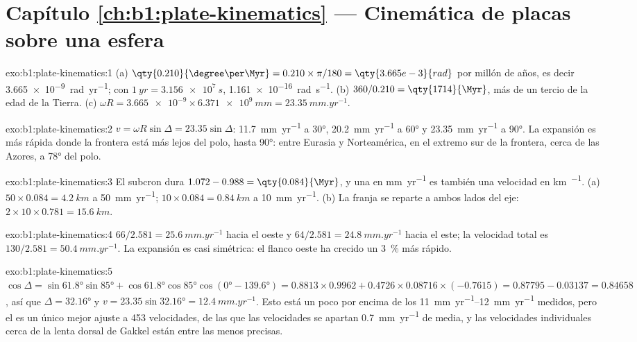 \section*{Capítulo \ref{ch:b1:plate-kinematics} --- Cinemática de placas sobre una esfera}

\begin{solution}{exo:b1:plate-kinematics:1}
(a) $\qty{0.210}{\degree\per\Myr} = 0.210\times\pi/180 = \qty{3.665e-3}{rad}$
por millón de años, es decir \qty{3.665e-9}{rad.yr^{-1}}; con
$\qty{1}{yr} = \qty{3.156e7}{s}$, \qty{1.161e-16}{rad.s^{-1}}. (b) $360/0.210 =
\qty{1714}{\Myr}$, más de un tercio de la edad de la Tierra. (c) $\omega R =
\num{3.665e-9}\times\qty{6.371e9}{mm} = \qty{23.35}{mm.yr^{-1}}$.
\end{solution}

\begin{solution}{exo:b1:plate-kinematics:2}
$v = \omega R\sin\Delta = 23.35\sin\Delta$: \qty{11.7}{mm.yr^{-1}} a \ang{30},
\qty{20.2}{mm.yr^{-1}} a \ang{60} y \qty{23.35}{mm.yr^{-1}} a \ang{90}. La
expansión es más rápida donde la frontera está más lejos del polo, hasta
\ang{90}: entre Eurasia y Norteamérica, en el extremo sur de la frontera, cerca de las Azores, a \ang{78} del polo.
\end{solution}

\begin{solution}{exo:b1:plate-kinematics:3}
El subcron dura $1.072 - 0.988 = \qty{0.084}{\Myr}$, y una  en
\unit{mm.yr^{-1}} es también una velocidad en \unit{km\per\Myr}. (a) $50\times0.084 =
\qty{4.2}{km}$ a \qty{50}{mm.yr^{-1}}; $10\times0.084 = \qty{0.84}{km}$ a
\qty{10}{mm.yr^{-1}}. (b) La franja se reparte a ambos lados del eje:
$2\times10\times0.781 = \qty{15.6}{km}$.
\end{solution}

\begin{solution}{exo:b1:plate-kinematics:4}
$66/2.581 = \qty{25.6}{mm.yr^{-1}}$ hacia el oeste y
$64/2.581 = \qty{24.8}{mm.yr^{-1}}$ hacia el este; la velocidad total es
$130/2.581 = \qty{50.4}{mm.yr^{-1}}$. La expansión es casi simétrica: el flanco oeste
ha crecido un \qty{3}{\percent} más rápido.
\end{solution}

\begin{solution}{exo:b1:plate-kinematics:5}
$\cos\Delta = \sin\ang{61.8}\sin\ang{85} + \cos\ang{61.8}\cos\ang{85}
\cos(\ang{0} - \ang{139.6}) = 0.8813\times0.9962 + 0.4726\times0.08716\times
(-0.7615) = 0.87795 - 0.03137 = 0.84658$, así que $\Delta = \ang{32.16}$ y
$v = 23.35\sin\ang{32.16} = \qty{12.4}{mm.yr^{-1}}$. Esto está un poco por encima de los
\qtyrange{11}{12}{mm.yr^{-1}} medidos, pero el  es un único mejor ajuste a
453 velocidades, de las que las velocidades se apartan \qty{0.7}{mm.yr^{-1}} de media, y las velocidades individuales cerca de la
lenta dorsal de Gakkel están entre las menos precisas.
\end{solution}

